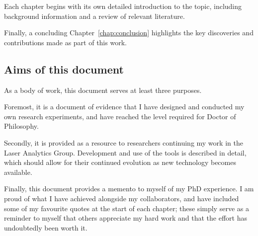 Each chapter begins with its own detailed introduction to the topic, including background information and a review of relevant literature. 

Finally, a concluding Chapter~\ref{chap:conclusion} highlights the key discoveries and contributions made as part of this work.

\subsection{Aims of this document}
As a body of work, this document serves at least three purposes. 

Foremost, it is a document of evidence that I have designed and conducted my own research experiments, and have reached the level required for Doctor of Philosophy. 

Secondly, it is provided as a resource to researchers continuing my work in the Laser Analytics Group. 
Development and use of the tools is described in detail, which should allow for their continued evolution as new technology becomes available. 

Finally, this document provides a memento to myself of my PhD experience. 
I am proud of what I have achieved alongside my collaborators, and have included some of my favourite quotes at the start of each chapter; these simply serve as a reminder to myself that others appreciate my hard work and that the effort has undoubtedly been worth it. 



